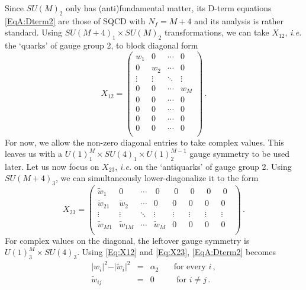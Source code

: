 \documentclass[a4paper,12pt]{article}
\begin{document}
{Since $SU(M)_2$ only has (anti)fundamental matter, its D-term equations \eqref{EqA:Dterm2} are those of SQCD with $N_f=M+4$ and its analysis is rather standard. Using $SU(M+4)_1\times SU(M)_2$ transformations, we can take $X_{12}$, {\it i.e.} the `quarks' of gauge group 2, to block diagonal form
	\begin{equation}
	X_{12}  = \left(\begin{array}{cccc}
			w_1 & 0 & \cdots & 0 \\
			0 & w_2 & \cdots & 0\\
			\vdots & \vdots  & \ddots & \vdots \\
			0 & 0 &  \cdots & w_M \\
			0 & 0 &  \cdots & 0  \\
			0 & 0 &  \cdots & 0 \\
			0 & 0 &  \cdots & 0 \\
			0 & 0 &  \cdots & 0  \\
		\end{array}\right) \, . \label{Eq:X12}
	\end{equation}
For now, we allow the non-zero diagonal entries to take complex values.  
This leaves us with a $U(1)^{M}_1 \times SU(4)_1\times U(1)^{M-1}_2$ gauge symmetry to be used later. Let us now focus on $X_{23}$, {\it i.e.} on the `antiquarks' of gauge group 2. Using $SU(M+4)_3$, we can simultaneously lower-diagonalize it to the form
\begin{equation}
	X_{23}  = \left(\begin{array}{cccccccc}
		\tilde{w}_1 & 0 & \cdots & \ 0 \ \ & \ 0 \ \ & \ 0 \ \ & \ 0 \ \ & \ 0 \ \ \\
		\tilde{w}_{21} & \tilde{w}_2 & \cdots & 0& 0& 0& 0& 0\\
		\vdots & \vdots  & \ddots & \vdots & \vdots & \vdots & \vdots & \vdots \\
		\tilde{w}_{M1} & \tilde{w}_{1M} &  \cdots & \tilde{w}_M & 0& 0& 0& 0\\
	\end{array}\right) \, .
	\label{Eq:X23}
\end{equation}
For complex values on the diagonal, the leftover gauge symmetry is $U(1)^{M}_3 \times SU(4)_3$. Using \eqref{Eq:X12} and \eqref{Eq:X23}, \eqref{EqA:Dterm2} becomes
	\begin{equation}
	\begin{array}{rcll}
	\vert w_i \vert^2 - \vert \tilde{w}_i \vert^2 &=& \alpha_2 & \quad \text{for every }i\, , \\
	\tilde{w}_{ij} &=&  0 & \quad \text{ for }i \neq j \, .
	\end{array}
	\end{equation}
	
}
\end{document}
